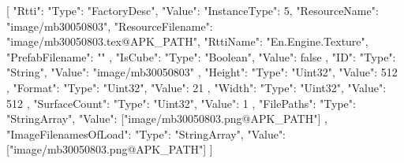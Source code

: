 [{
        "Rtti": {
            "Type": "FactoryDesc",
            "Value": {
                "InstanceType": 5,
                "ResourceName": "image/mb30050803",
                "ResourceFilename": "image/mb30050803.tex@APK_PATH",
                "RttiName": "En.Engine.Texture",
                "PrefabFilename": ""
            }
        },
        "IsCube": {
            "Type": "Boolean",
            "Value": false
        },
        "ID": {
            "Type": "String",
            "Value": "image/mb30050803"
        },
        "Height": {
            "Type": "Uint32",
            "Value": 512
        },
        "Format": {
            "Type": "Uint32",
            "Value": 21
        },
        "Width": {
            "Type": "Uint32",
            "Value": 512
        },
        "SurfaceCount": {
            "Type": "Uint32",
            "Value": 1
        },
        "FilePaths": {
            "Type": "StringArray",
            "Value": ["image/mb30050803.png@APK_PATH"]
        },
        "ImageFilenamesOfLoad": {
            "Type": "StringArray",
            "Value": ["image/mb30050803.png@APK_PATH"]
        }
    }]